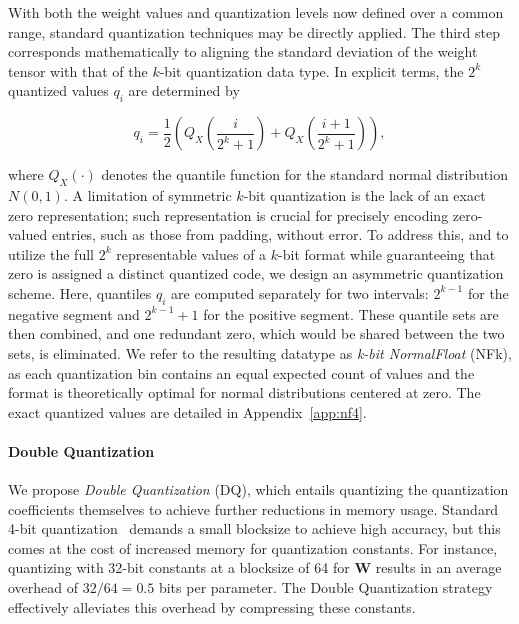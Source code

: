 With both the weight values and quantization levels now defined over a common range, standard quantization techniques may be directly applied. The third step corresponds mathematically to aligning the standard deviation of the weight tensor with that of the $k$-bit quantization data type. In explicit terms, the $2^k$ quantized values $q_i$ are determined by

\begin{equation}
q_i = \frac{1}{2} \left( Q_X \left( \frac{i}{2^k+1} \right ) + Q_X \left( \frac{i+1}{2^k+1} \right) \right),
\end{equation}

where $Q_X(\cdot)$ denotes the quantile function for the standard normal distribution $N(0,1)$. A limitation of symmetric $k$-bit quantization is the lack of an exact zero representation; such representation is crucial for precisely encoding zero-valued entries, such as those from padding, without error. To address this, and to utilize the full $2^k$ representable values of a $k$-bit format while guaranteeing that zero is assigned a distinct quantized code, we design an asymmetric quantization scheme. Here, quantiles $q_i$ are computed separately for two intervals: $2^{k-1}$ for the negative segment and $2^{k-1}+1$ for the positive segment. These quantile sets are then combined, and one redundant zero, which would be shared between the two sets, is eliminated. We refer to the resulting datatype as \emph{k-bit NormalFloat} (NFk), as each quantization bin contains an equal expected count of values and the format is theoretically optimal for normal distributions centered at zero. The exact quantized values are detailed in Appendix~\ref{app:nf4}.

\paragraph{Double Quantization{}} 
We propose \emph{Double Quantization} (DQ), which entails quantizing the quantization coefficients themselves to achieve further reductions in memory usage. Standard 4-bit quantization~\citep{dettmers2022case} demands a small blocksize to achieve high accuracy, but this comes at the cost of increased memory for quantization constants. For instance, quantizing with 32-bit constants at a blocksize of 64 for $\mathbf{W}$ results in an average overhead of $32/64 = 0.5$ bits per parameter. The Double Quantization strategy effectively alleviates this overhead by compressing these constants.

